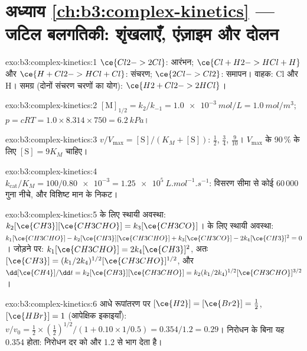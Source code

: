\section*{अध्याय \ref{ch:b3:complex-kinetics} --- जटिल बलगतिकी: शृंखलाएँ, एंज़ाइम और दोलन}

\begin{solution}{exo:b3:complex-kinetics:1}
$\ce{Cl2 -> 2 Cl}$: आरंभन; $\ce{Cl + H2 -> HCl + H}$ और $\ce{H + Cl2 -> HCl + Cl}$:
संचरण; $\ce{2 Cl -> Cl2}$: समापन। वाहक: Cl और H। समग्र (दोनों
संचरण चरणों का योग): $\ce{H2 + Cl2 -> 2 HCl}$।
\end{solution}

\begin{solution}{exo:b3:complex-kinetics:2}
$[\mathrm M]_{1/2} = k_2/k_{-1} = \qty{1.0e-3}{mol/L} = \qty{1.0}{mol/m^3}$; $p = cRT = 1.0 \times 8.314 \times 750 =
\qty{6.2}{kPa}$।
\end{solution}

\begin{solution}{exo:b3:complex-kinetics:3}
$v/V_{\max} = [\mathrm S]/(K_M + [\mathrm S])$: $\frac12$, $\frac34$, $\frac{9}{10}$। $V_{\max}$ के 90\,\% के लिए $[\mathrm S] = 9K_M$ चाहिए।
\end{solution}

\begin{solution}{exo:b3:complex-kinetics:4}
$k_{\mathrm{cat}}/K_M = 100/\num{0.80e-3} = \qty{1.25e5}{L.mol^{-1}.s^{-1}}$: विसरण सीमा से कोई 60\,000 गुना नीचे,
और विशिष्ट मान के निकट।
\end{solution}

\begin{solution}{exo:b3:complex-kinetics:5}
 के लिए स्थायी अवस्था: $k_2[\ce{CH3}][\ce{CH3CHO}] = k_3[\ce{CH3CO}]$।  के लिए स्थायी अवस्था:
$k_1[\ce{CH3CHO}] - k_2[\ce{CH3}][\ce{CH3CHO}] + k_3[\ce{CH3CO}] - 2k_4[\ce{CH3}]^2 = 0$। जोड़ने पर: $k_1[\ce{CH3CHO}] =
2k_4[\ce{CH3}]^2$, अतः $[\ce{CH3}] = (k_1/2k_4)^{1/2}[\ce{CH3CHO}]^{1/2}$, और $\dd[\ce{CH4}]/\dd t = k_2[\ce{CH3}][\ce{CH3CHO}] =
k_2(k_1/2k_4)^{1/2}[\ce{CH3CHO}]^{3/2}$।
\end{solution}

\begin{solution}{exo:b3:complex-kinetics:6}
आधे रूपांतरण पर $[\ce{H2}] = [\ce{Br2}] = \frac12$, $[\ce{HBr}] = 1$ (आपेक्षिक इकाइयाँ):
$v/v_0 = \frac12 \times (\frac12)^{1/2}/(1 + 0.10 \times 1/0.5) = 0.354/1.2 = 0.29$। निरोधन के बिना यह
0.354 होता: निरोधन दर को और 1.2 से भाग देता है।
\end{solution}

